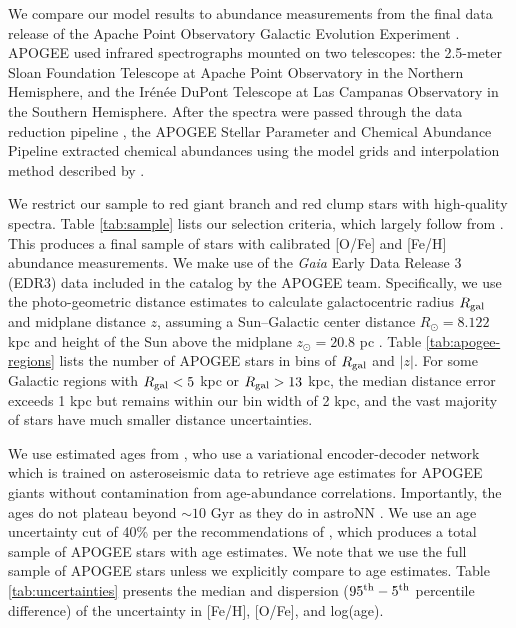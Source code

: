 \documentclass[twocolumn,twocolappendix]{aastex631}
\begin{document}
We compare our model results to abundance measurements from the final data release \citep[DR17;][]{Abdurro'uf2022-SDSSIV-DR17} of the Apache Point Observatory Galactic Evolution Experiment \citep[APOGEE;][]{Majewski2017-APOGEE}. APOGEE used infrared spectrographs \citep{Wilson2019-APOGEE-Spectrographs} mounted on two telescopes: the 2.5-meter Sloan Foundation Telescope \citep{Gunn2006-SloanTelescope} at Apache Point Observatory in the Northern Hemisphere, and the Ir{\'e}n{\'e}e DuPont Telescope \citep{BowenVaughan1973-DuPontTelescope} at Las Campanas Observatory in the Southern Hemisphere. After the spectra were passed through the data reduction pipeline \citep{Nidever2015-APOGEE-DataReduction}, the APOGEE Stellar Parameter and Chemical Abundance Pipeline \citep[ASPCAP;][]{Holtzmann2015-ASPCAP,GarciaPerez2016-ASPCAP} extracted chemical abundances using the model grids and interpolation method described by \citet{Jonsson2020-APOGEE-DR16}.

We restrict our sample to red giant branch and red clump stars with high-quality spectra. Table \ref{tab:sample} lists our selection criteria, which largely follow from \citet{Hayden2015-ChemicalCartography}. This produces a final sample of  stars with calibrated [O/Fe] and [Fe/H] abundance measurements. We make use of the {\it Gaia} Early Data Release 3 (EDR3) data \citep{Gaia2016-Mission,Gaia2021-EDR3} included in the catalog by the APOGEE team. Specifically, we use the \citet{Bailer-Jones2021-GaiaDistances} photo-geometric distance estimates to calculate galactocentric radius $R_{\rm gal}$ and midplane distance $z$, assuming a Sun--Galactic center distance $R_\odot=8.122$ kpc \citep{GRAVITY2018-GalactocentricDistance} and height of the Sun above the midplane $z_\odot=20.8$ pc \citep{BennetBovy2019-SunZHeight}. Table \ref{tab:apogee-regions} lists the number of APOGEE stars in bins of $R_{\rm gal}$ and $|z|$. For some Galactic regions with $R_{\rm gal}<5$ kpc or $R_{\rm gal}>13$ kpc, the median distance error exceeds 1 kpc but remains within our bin width of 2 kpc, and the vast majority of stars have much smaller distance uncertainties.

We use estimated ages from \citet[][hereafter ]{Leung2023-Ages}, who use a variational encoder-decoder network which is trained on asteroseismic data to retrieve age estimates for APOGEE giants without contamination from age-abundance correlations. Importantly, the  ages do not plateau beyond $\sim10$ Gyr as they do in astroNN \citep{Mackereth2019-astroNN-Ages}. We use an age uncertainty cut of 40\% per the recommendations of , which produces a total sample of  APOGEE stars with age estimates. We note that we use the full sample of  APOGEE stars unless we explicitly compare to age estimates. Table \ref{tab:uncertainties} presents the median and dispersion ($95^{\rm th} - 5^{\rm th}$ percentile difference) of the uncertainty in [Fe/H], [O/Fe], and log(age).
\end{document}
